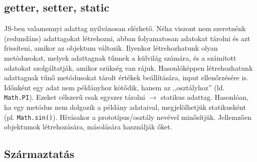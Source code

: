 \begin{frame}
    \begin{exampleblock}{}
        
    \end{exampleblock}
\end{frame}

\subsection{getter, setter, static}

\begin{frame}
    JS-ben valamennyi adattag nyilvánosan elérhető. Néha viszont nem szeretnénk (redundáns) adattagokat létrehozni, abban folyamatosan
    adatokat tárolni és azt frissíteni, amikor az objektum változik. Ilyenkor létrehozhatunk olyan metódusokat, melyek adattagnak
    tűnnek a külvilág számára, és a számított adatokat szolgáltatják, amikor szükség van rájuk.
    \vfill
    Hasonlóképpen létrehozhatunk adattagnak tűnő metódusokat tárolt értékek beállítására, input ellenőrzésére is.
    \vfill
    Időnként egy adat nem példányhoz kötődik, hanem az ,,osztályhoz'' (ld. \texttt{Math.PI}). Ezeket célszerű csak egyszer tárolni
    $\to$ statikus adattag. Hasonlóan, ha egy metódus nem dolgozik a példány adataival, megjelölhetjük statikusként (pl. \texttt{Math.sin()}).
    Hívásakor a prototípus/osztály nevével minősítjük. Jellemzően objektumok létrehozására, másolására használják őket.
\end{frame}

\begin{frame}
    \begin{exampleblock}{}
        \scriptsize
        
    \end{exampleblock}
\end{frame}

\begin{frame}
    \begin{exampleblock}{}
        \footnotesize
        
    \end{exampleblock}
\end{frame}

\subsection{Származtatás}

